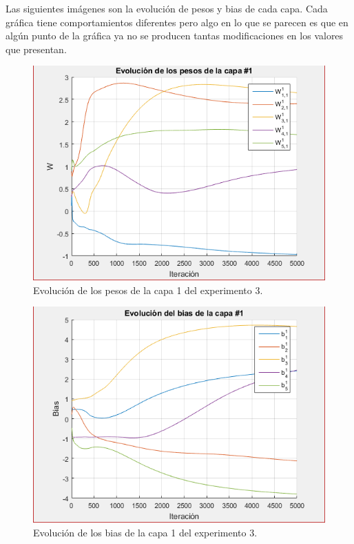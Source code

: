 Las siguientes imágenes son la evolución de pesos y bias de cada capa. Cada gráfica tiene comportamientos diferentes pero algo en lo que se parecen es que en algún punto de la gráfica ya no se producen tantas modificaciones en los valores que presentan.
\begin{figure}[H]
    \begin{center}
        \includegraphics[width=12cm]{3/pesos1.png}
        \caption{Evolución de los pesos de la capa 1 del experimento 3.}
        \label{fig:pesos5}
    \end{center}
\end{figure}

\begin{figure}[H]
    \begin{center}
        \includegraphics[width=12cm]{3/bias1.png}
        \caption{Evolución de los bias de la capa 1 del experimento 3.}
        \label{fig:bias5}
    \end{center}
\end{figure}

